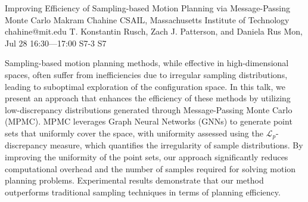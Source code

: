 \begin{talk}
  {Improving Efficiency of Sampling-based Motion Planning via Message-Passing Monte Carlo}%
  {Makram Chahine}%
  {CSAIL, Massachusetts Institute of Technology}%
  {chahine@mit.edu}%
  {T. Konstantin Rusch, Zach J. Patterson, and Daniela Rus}%
  {}%
  {Mon, Jul 28 16:30---17:00}%
  {S7-3}%
  {S7}%
  
    
   
Sampling-based motion planning methods, while effective in high-dimensional spaces, often suffer from inefficiencies due to irregular sampling distributions, leading to suboptimal exploration of the configuration space. In this talk, we present an approach that enhances the efficiency of these methods by utilizing low-discrepancy distributions generated through Message-Passing Monte Carlo (MPMC). MPMC leverages Graph Neural Networks (GNNs) to generate point sets that uniformly cover the space, with uniformity assessed using the $\mathcal{L}_p$-discrepancy measure, which quantifies the irregularity of sample distributions. By improving the uniformity of the point sets, our approach significantly reduces computational overhead and the number of samples required for solving motion planning problems. Experimental results demonstrate that our method outperforms traditional sampling techniques in terms of planning efficiency.

\medskip


\end{talk}


